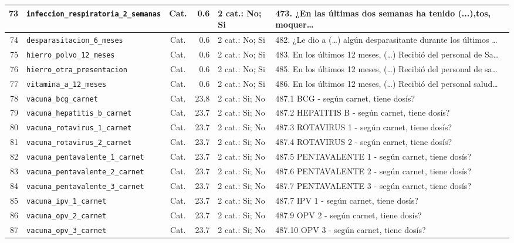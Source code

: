 \begin{longtable}{|r|p{3.1cm}|c|r|p{3.0cm}|p{3.8cm}|}
  73 & \texttt{infeccion\_respiratoria\_2\_semanas} & Cat. & 0.6 & 2 cat.: No; Si & 473.  ¿En las últimas dos semanas ha tenido (...),tos, moquer… \\ \hline
  74 & \texttt{desparasitacion\_6\_meses} & Cat. & 0.6 & 2 cat.: No; Si & 482.  ¿Le dio a (…) algún desparasitante durante los últimos … \\ \hline
  75 & \texttt{hierro\_polvo\_12\_meses} & Cat. & 0.6 & 2 cat.: No; Si & 483.  En los últimos 12 meses, (…) Recibió del personal de Sa… \\ \hline
  76 & \texttt{hierro\_otra\_presentacion} & Cat. & 0.6 & 2 cat.: No; Si & 485.  En los últimos 12 meses, (…) Recibió del personal de sa… \\ \hline
  77 & \texttt{vitamina\_a\_12\_meses} & Cat. & 0.6 & 2 cat.: No; Si & 486.  En los últimos 12 meses, (…) Recibió del personal salud… \\ \hline
  78 & \texttt{vacuna\_bcg\_carnet} & Cat. & 23.8 & 2 cat.: Si; No & 487.1 BCG - según carnet, tiene dosís? \\ \hline
  79 & \texttt{vacuna\_hepatitis\_b\_carnet} & Cat. & 23.7 & 2 cat.: Si; No & 487.2 HEPATITIS B - según carnet, tiene dosís? \\ \hline
  80 & \texttt{vacuna\_rotavirus\_1\_carnet} & Cat. & 23.7 & 2 cat.: Si; No & 487.3 ROTAVIRUS 1 - según carnet, tiene dosís? \\ \hline
  81 & \texttt{vacuna\_rotavirus\_2\_carnet} & Cat. & 23.7 & 2 cat.: Si; No & 487.4 ROTAVIRUS 2 - según carnet, tiene dosís? \\ \hline
  82 & \texttt{vacuna\_pentavalente\_1\_carnet} & Cat. & 23.7 & 2 cat.: Si; No & 487.5 PENTAVALENTE 1 - según carnet, tiene dosís? \\ \hline
  83 & \texttt{vacuna\_pentavalente\_2\_carnet} & Cat. & 23.7 & 2 cat.: Si; No & 487.6 PENTAVALENTE 2 - según carnet, tiene dosís? \\ \hline
  84 & \texttt{vacuna\_pentavalente\_3\_carnet} & Cat. & 23.7 & 2 cat.: Si; No & 487.7 PENTAVALENTE 3 - según carnet, tiene dosís? \\ \hline
  85 & \texttt{vacuna\_ipv\_1\_carnet} & Cat. & 23.7 & 2 cat.: Si; No & 487.7 IPV 1 - según carnet, tiene dosís? \\ \hline
  86 & \texttt{vacuna\_opv\_2\_carnet} & Cat. & 23.7 & 2 cat.: Si; No & 487.9 OPV 2 - según carnet, tiene dosís? \\ \hline
  87 & \texttt{vacuna\_opv\_3\_carnet} & Cat. & 23.7 & 2 cat.: Si; No & 487.10 OPV 3 - según carnet, tiene dosís? \\ \hline

\end{longtable}
